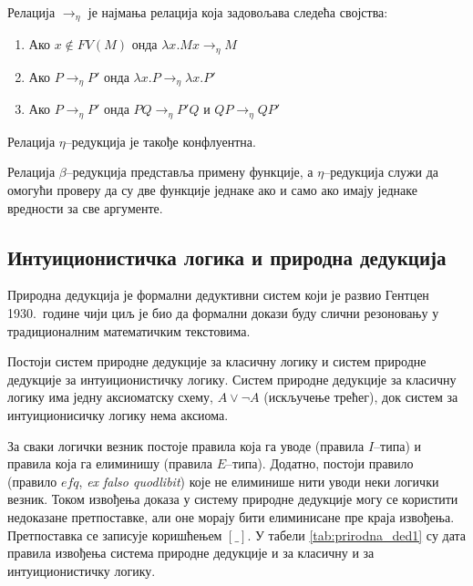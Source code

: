 \begin{definition}
Релација $\to_{\eta}$ је најмања релација која задовољава следећа
својства:
\begin{enumerate}
\item Ако $x \notin FV(M)$ онда $\lambda x.Mx \to_{\eta} M$
\item Ако $P \to_{\eta} P'$ онда $\lambda x. P \to_{\eta} \lambda x. P'$
\item Ако $P \to_{\eta} P'$ онда $PQ \to_{\eta} P'Q$ и $QP \to_{\eta} QP'$
\end{enumerate}
\end{definition}

Релација $\eta$--редукција је такође конфлуентна.

Релација $\beta$--редукција представља примену функције, а
$\eta$--редукција служи да омогући проверу да су две функције једнаке
ако и само ако имају једнаке вредности за све аргументе.

\subsection{Интуиционистичка логика и природна дедукција}
\label{section:natural_deduction}

Природна дедукција је формални дедуктивни систем који је развио
Гентцен 1930.~године \cite{gentzen1935untersuchungen,
  gentzen1935untersuchungen1} чији циљ је био да формални докази буду
слични резоновању у традиционалним математичким текстовима.

Постоји систем природне дедукције за класичну логику и систем природне
дедукције за интуиционистичку логику. Систем природне дедукције за
класичну логику има једну аксиоматску схему, $A \lor \neg A$
(искључење трећег), док систем за интуиционисичку логику нема аксиома.

За сваки логички везник постоје правила која га уводе (правила
$I$--типа) и правила која га елиминишу (правила $E$--типа). Додатно,
постоји правило (правило $efq$, \emph{ex falso quodlibit}) које не
елиминише нити уводи неки логички везник. Током извођења доказа у
систему природне дедукције могу се користити недоказане претпоставке,
али оне морају бити елиминисане пре краја извођења. Претпоставка се
записује коришћењем $[\_]$. У табели \ref{tab:prirodna_ded1} су дата
правила извођења система природне дедукције и за класичну и за
интуиционистичку логику.


